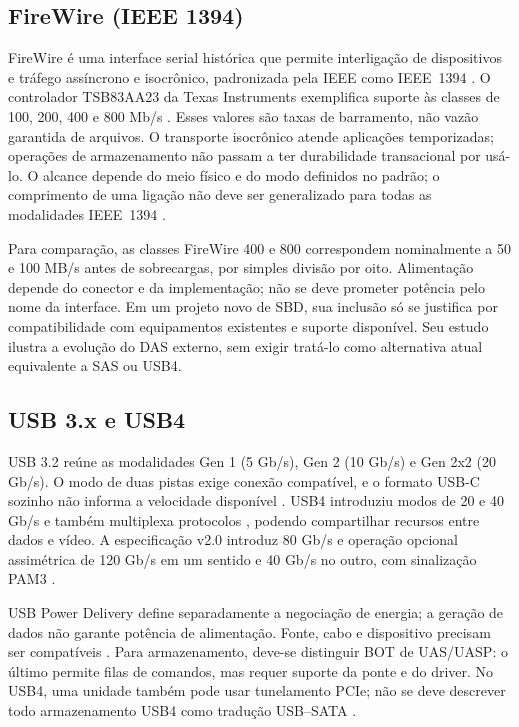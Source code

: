 \documentclass[titlepage]{article}
\begin{document}
\subsection{FireWire (IEEE 1394)}
FireWire é uma interface serial histórica que permite interligação de dispositivos e tráfego assíncrono e isocrônico, padronizada pela IEEE como IEEE~1394 \cite{ieee1394_2008}. O controlador TSB83AA23 da Texas Instruments exemplifica suporte às classes de 100, 200, 400 e 800 Mb/s \cite{ti_firewire}. Esses valores são taxas de barramento, não vazão garantida de arquivos. O transporte isocrônico atende aplicações temporizadas; operações de armazenamento não passam a ter durabilidade transacional por usá-lo. O alcance depende do meio físico e do modo definidos no padrão; o comprimento de uma ligação não deve ser generalizado para todas as modalidades IEEE~1394 \cite{ieee1394_2008}.

Para comparação, as classes FireWire 400 e 800 correspondem nominalmente a 50 e 100 MB/s antes de sobrecargas, por simples divisão por oito. Alimentação depende do conector e da implementação; não se deve prometer potência pelo nome da interface. Em um projeto novo de SBD, sua inclusão só se justifica por compatibilidade com equipamentos existentes e suporte disponível. Seu estudo ilustra a evolução do DAS externo, sem exigir tratá-lo como alternativa atual equivalente a SAS ou USB4.

\subsection{USB 3.x e USB4}
USB 3.2 reúne as modalidades Gen 1 (5 Gb/s), Gen 2 (10 Gb/s) e Gen 2x2 (20 Gb/s). O modo de duas pistas exige conexão compatível, e o formato USB-C sozinho não informa a velocidade disponível \cite{usb32}. USB4 introduziu modos de 20 e 40 Gb/s e também multiplexa protocolos \cite{usb4_overview}, podendo compartilhar recursos entre dados e vídeo. A especificação v2.0 introduz 80 Gb/s e operação opcional assimétrica de 120 Gb/s em um sentido e 40 Gb/s no outro, com sinalização PAM3 \cite{usb4_announcement}.

USB Power Delivery define separadamente a negociação de energia; a geração de dados não garante potência de alimentação. Fonte, cabo e dispositivo precisam ser compatíveis \cite{usb_pd}. Para armazenamento, deve-se distinguir BOT de UAS/UASP: o último permite filas de comandos, mas requer suporte da ponte e do driver. No USB4, uma unidade também pode usar tunelamento PCIe; não se deve descrever todo armazenamento USB4 como tradução USB--SATA \cite{usb_uas,usb4_spec}.
\end{document}
